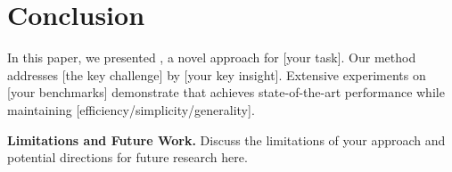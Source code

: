\section{Conclusion}
\label{sec:conclusion}

In this paper, we presented \method, a novel approach for [your task]. Our method addresses [the key challenge] by [your key insight]. Extensive experiments on [your benchmarks] demonstrate that \method achieves state-of-the-art performance while maintaining [efficiency/simplicity/generality].

\noindent\textbf{Limitations and Future Work.}
Discuss the limitations of your approach and potential directions for future research here.
